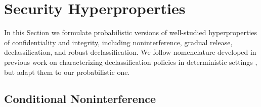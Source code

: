 \section{Security Hyperproperties}
\label{section-hyper}

In this Section we formulate probabilistic versions of well-studied
hyperproperties of confidentiality and integrity, including
noninterference, gradual release, declassification, and robust
declassification.  We follow nomenclature developed in previous work
on characterizing declassification policies in deterministic settings
\cite{sabelfeld2009declassification}, but adapt them to our
probabilistic one.



\subsection{Conditional Noninterference}

